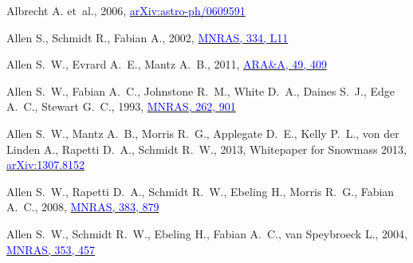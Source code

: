 \documentclass[useAMS,usenatbib,usegraphicx]{mn2e}
\begin{document}
\def \araa {ARA\&A}
\def \aj {AJ}
\def \aar {A\&AR}
\def \apj {ApJ}
\def \apjl {ApJL}
\def \apjs {ApJS}
\def \asl {Adv. Sci. Lett.} 
\def \mnras {MNRAS}
\def \nat {Nat}
\def \pasj {PASJ}
\def \pasp {PASP}
\def \science {Sci}
\def \compcom {Comput.\ Phys.\ Commun.}
\def \gca {Geochim.\ Cosmochim.\ Acta}
\def \npa {Nucl.\ Phys.\ A}
\def \plb {Phys.\ Lett.\ B}
\def \prc {Phys.\ Rev.\ C}
\def \prd {Phys.\ Rev.\ D}
\def \prl {Phys.\ Rev.\ Lett.}
%
%
\begin{thebibliography}{}

{Albrecht} A. et~al., 2006,
  \href{http://arxiv.org/abs/arXiv:astro-ph/0609591}{\textcolor{blue}{arXiv:astro-ph/0609591}}

{Allen} S., {Schmidt} R.,  {Fabian} A., 2002,
  \href{http://adsabs.harvard.edu/abs/2002MNRAS.334L..11A}{\textcolor{blue}{\mnras,
  334, L11}}

{Allen} S.~W., {Evrard} A.~E.,  {Mantz} A.~B., 2011,
  \href{http://adsabs.harvard.edu/abs/2011ARA%26A..49..409A}{\textcolor{blue}{\araa,
  49, 409}}

{Allen} S.~W., {Fabian} A.~C., {Johnstone} R.~M., {White} D.~A., {Daines}
  S.~J., {Edge} A.~C.,  {Stewart} G.~C., 1993,
  \href{http://adsabs.harvard.edu/abs/1993MNRAS.262..901A}{\textcolor{blue}{\mnras,
  262, 901}}

{Allen} S.~W., {Mantz} A.~B., {Morris} R.~G., {Applegate} D.~E., {Kelly} P.~L.,
  {von der Linden} A., {Rapetti} D.~A.,  {Schmidt} R.~W., 2013,
 Whitepaper for Snowmass 2013,
  \href{http://arxiv.org/abs/1307.8152}{\textcolor{blue}{arXiv:1307.8152}}

{Allen} S.~W., {Rapetti} D.~A., {Schmidt} R.~W., {Ebeling} H., {Morris} R.~G.,
  {Fabian} A.~C., 2008,
  \href{http://adsabs.harvard.edu/abs/2008MNRAS.383..879A}{\textcolor{blue}{\mnras,
  383, 879}}

{Allen} S.~W., {Schmidt} R.~W., {Ebeling} H., {Fabian} A.~C.,  {van Speybroeck}
  L., 2004,
  \href{http://adsabs.harvard.edu/abs/2004MNRAS.353..457A}{\textcolor{blue}{\mnras,
  353, 457}}


\end{thebibliography}
\end{document}
